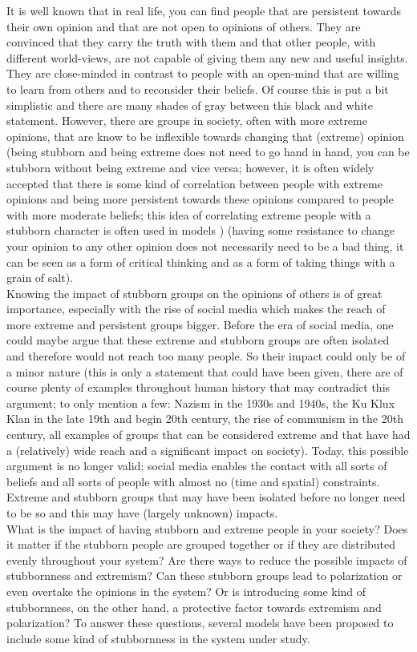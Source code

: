 \documentclass[11 pt , letterpaper , twoside , openright]{book}
\begin{document}
It is well known that in real life, you can find people that are persistent towards their own opinion and that are not open to opinions of others. They are convinced that they carry the truth with them and that other people, with different world-views, are not capable of giving them any new and useful insights. They are close-minded in contrast to people with an open-mind that are willing to learn from others and to reconsider their beliefs. Of course this is put a bit simplistic and there are many shades of gray between this black and white statement. However, there are groups in society, often with more extreme opinions, that are know to be inflexible towards changing that (extreme) opinion (being stubborn and being extreme does not need to go hand in hand, you can be stubborn without being extreme and vice versa; however, it is often widely accepted that there is some kind of correlation between people with extreme opinions and being more persistent towards these opinions compared to people with more moderate beliefs; this idea of correlating extreme people with a stubborn character is often used in models \cite{Deffuant2006}\cite{Deffuant2002}\cite{Turner}) (having some resistance to change your opinion to any other opinion does not necessarily need to be a bad thing, it can be seen as a form of critical thinking and as a form of taking things with a grain of salt).\\ 
\newline
Knowing the impact of stubborn groups on the opinions of others is of great importance, especially with the rise of social media which makes the reach of more extreme and persistent groups bigger. Before the era of social media, one could maybe argue that these extreme and stubborn groups are often isolated and therefore would not reach too many people. So their impact could only be of a minor nature (this is only a statement that could have been given, there are of course plenty of examples throughout human history that may contradict this argument; to only mention a few: Nazism in the 1930s and 1940s, the Ku Klux Klan in the late 19th and begin 20th century, the rise of communism in the 20th century, all examples of groups that can be considered extreme and that have had a (relatively) wide reach and a significant impact on society). Today, this possible argument is no longer valid; social media enables the contact with all sorts of beliefs and all sorts of people with almost no (time and spatial) constraints. Extreme and stubborn groups that may have been isolated before no longer need to be so and this may have (largely unknown) impacts. \\
\newline
What is the impact of having stubborn and extreme people in your society? Does it matter if the stubborn people are grouped together or if they are distributed evenly throughout your system? Are there ways to reduce the possible impacts of stubbornness and extremism? Can these stubborn groups lead to polarization or even overtake the opinions in the system? Or is introducing some kind of stubbornness, on the other hand, a protective factor towards extremism and polarization? To answer these questions, several models have been proposed to include some kind of stubbornness in the system under study.
\end{document}
